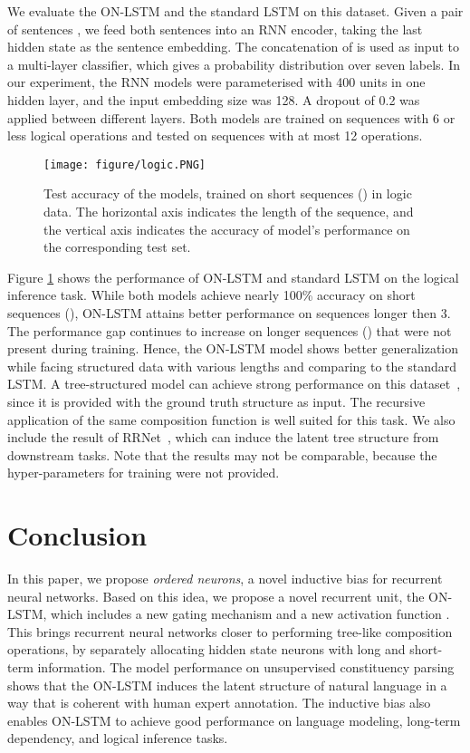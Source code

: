 \documentclass{article} \usepackage{iclr2019_conference,times}
\begin{document}
We evaluate the ON-LSTM and the standard LSTM on this dataset.
Given a pair of sentences , we feed both sentences into an RNN encoder, taking the last hidden state  as the sentence embedding.
The concatenation of  is used as input to a multi-layer classifier, which gives a probability distribution over seven labels.
In our experiment, the RNN models were parameterised with 400 units in one hidden layer, and the input embedding size was 128.
A dropout of 0.2 was applied between different layers.
Both models are trained on sequences with 6 or less logical operations and tested on sequences with at most 12 operations.

\begin{figure}
    \centering
    \texttt{[image: figure/logic.PNG]}
    \caption{Test accuracy of the models, trained on short sequences () in logic data. The horizontal
axis indicates the length of the sequence, and the vertical axis indicates the accuracy of model’s performance on the corresponding test set.}
\label{fig:logic}
\end{figure}


Figure \ref{fig:logic} shows the performance of ON-LSTM and standard LSTM on the logical inference task. While both models achieve nearly 100\% accuracy on short sequences (), ON-LSTM attains better performance on sequences longer then 3.
The performance gap continues to increase on longer sequences () that were not present during training. 
Hence, the ON-LSTM model shows better generalization while facing structured data with various lengths and comparing to the standard LSTM. A tree-structured model can achieve strong performance on this dataset~\citep{bowman2015tree}, since it is provided with the ground truth structure as input.
The recursive application of the same composition function is well suited for this task.
We also include the result of RRNet~\citep{jacob2018learning}, which can induce the latent tree structure from downstream tasks. Note that the results may not be comparable, because the hyper-parameters for training were not provided. 


\section{Conclusion}
In this paper, we propose \emph{ordered neurons}, a novel inductive bias for recurrent neural networks. 
Based on this idea, we propose a novel recurrent unit, the ON-LSTM, which includes a new gating mechanism and a new activation function .
This brings recurrent neural networks closer to performing tree-like composition operations, by separately allocating hidden state neurons with long and short-term information.
The model performance on unsupervised constituency parsing shows that the ON-LSTM induces the latent structure of natural language in a way that is coherent with human expert annotation.
The inductive bias also enables ON-LSTM to achieve good performance on language modeling, long-term dependency, and logical inference tasks.
\end{document}
